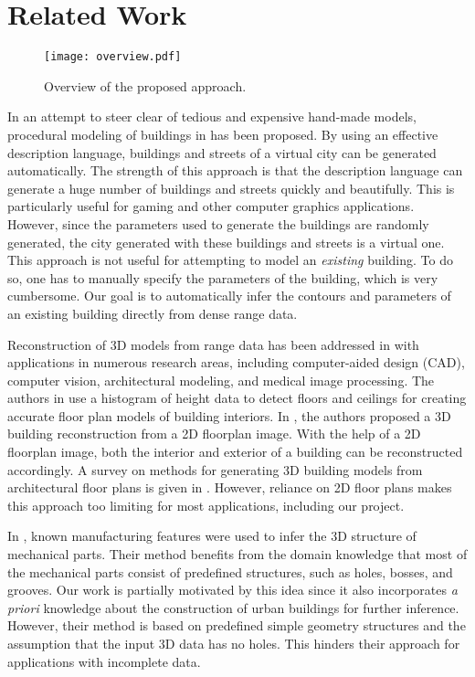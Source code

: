 \documentclass[10pt, conference, compsocconf]{IEEEtran}
\begin{document}
\section{Related Work}

\begin{figure*}[htbp]
\begin{center}
\texttt{[image: overview.pdf]}
\end{center}
\caption{Overview of the proposed approach.}
\label{fig:ov}
\end{figure*}

In an attempt to steer clear of tedious and expensive hand-made models,
procedural modeling of buildings in \cite{PMB_MWH} has been proposed.
By using an effective description language, buildings and streets of a virtual
city can be generated automatically.
The strength of this approach is that the description language can generate
a huge number of buildings and streets quickly and beautifully.
This is particularly useful for gaming and other computer graphics applications.
However, since the parameters used to generate the buildings are randomly
generated, the city generated with these buildings and streets is a virtual one.
This approach is not useful for attempting to model an {\it existing} building.
To do so, one has to manually specify the parameters of the building,
which is very cumbersome.
Our goal is to automatically infer the contours and parameters
of an existing building directly from dense range data.

Reconstruction of 3D models from range data has been addressed in
\cite{RE_Fisher} with applications in numerous research areas,
including computer-aided design (CAD), computer vision, architectural modeling,
and medical image processing.
The authors in \cite{Okorn10} use a histogram of height data to detect floors
and ceilings for creating accurate floor plan models of building interiors.
In \cite{DP_OWYC}, the authors proposed a 3D building reconstruction from a
2D floorplan image.
With the help of a 2D floorplan image, both the interior and exterior of a
building can be reconstructed accordingly.
A survey on methods for generating 3D building models from architectural
floor plans is given in \cite{YIN09}.
However, reliance on 2D floor plans makes this approach too limiting for
most applications, including our project.

In \cite{RE_TOGSH}, known manufacturing features were used to infer the
3D structure of mechanical parts.
Their method benefits from the domain knowledge that most of the mechanical
parts consist of predefined structures, such as holes, bosses, and grooves.
Our work is partially motivated by this idea since it also incorporates
{\it a priori} knowledge about the construction of urban buildings for further
inference.
However, their method is based on predefined simple geometry structures and
the assumption that the input 3D data has no holes.
This hinders their approach for applications with incomplete data.
\end{document}
